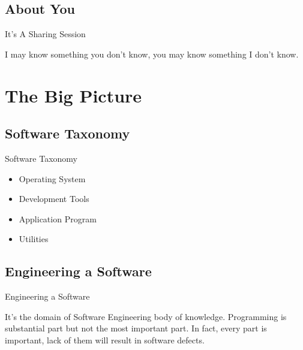 \documentclass[10pt]{beamer}
\begin{document}
  \subsection{About You}

    \begin{frame}[fragile]{It's A Sharing Session}

      I may know something you don't know, you may know something I don't know.

    \end{frame}

\section{The Big Picture}

  \subsection{Software Taxonomy}

    \begin{frame}[fragile]{Software Taxonomy}

      \begin{itemize}
        \item Operating System
        \item Development Tools
        \item Application Program
        \item Utilities
      \end{itemize}

    \end{frame}

  \subsection{Engineering a Software}

    \begin{frame}[fragile]{Engineering a Software}

      It's the domain of Software Engineering body of knowledge. Programming is substantial part but
      not the most important part. In fact, every part is important, lack of them will result in
      software defects.


    \end{frame}
\end{document}
